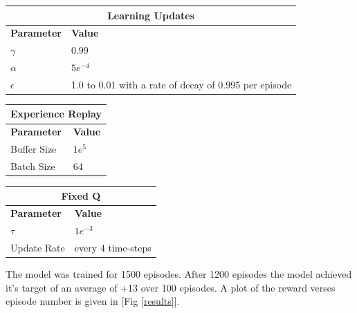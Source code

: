 \documentclass[12pt]{article}
\begin{document}
\begin{table}[h!]
\begin{center}
\begin{tabular}{|l|l|}
	\hline
	\multicolumn{2}{|c|}{\textbf{Learning Updates}}\\
	\hline
	\textbf{Parameter} & \textbf{Value}\\
	\hline
	$\gamma$ & $0.99$\\
	$\alpha$ & $5e^{-4}$\\
	$\epsilon$ & 1.0 to 0.01 with a rate of decay of 0.995 per episode\\
	\hline
\end{tabular}
\end{center}
\end{table}

\begin{table}[h!]
\begin{minipage}{.5\linewidth}
\begin{tabular}{|l|l|}
	\hline
	\multicolumn{2}{|c|}{\textbf{Experience Replay}}\\
	\hline
	\textbf{Parameter} & \textbf{Value}\\
	\hline
	Buffer Size & $1e^{5}$\\
	Batch Size & $64$\\
	\hline
\end{tabular}
\end{minipage}
\begin{minipage}{.5\linewidth}
\begin{tabular}{|l|l|}
	\hline
	\multicolumn{2}{|c|}{\textbf{Fixed Q}}\\
	\hline
	\textbf{Parameter} & \textbf{Value}\\
	\hline
		$\tau$ & $1e^{-3}$\\
		Update Rate & every 4 time-steps \\
	\hline
\end{tabular}
\end{minipage}
\end{table}

The model was trained for 1500 episodes. 
After 1200 episodes the model achieved it's target of an average of +13 over 100 episodes.
A plot of the reward verses episode number is given in [Fig \ref{results}].
\end{document}
